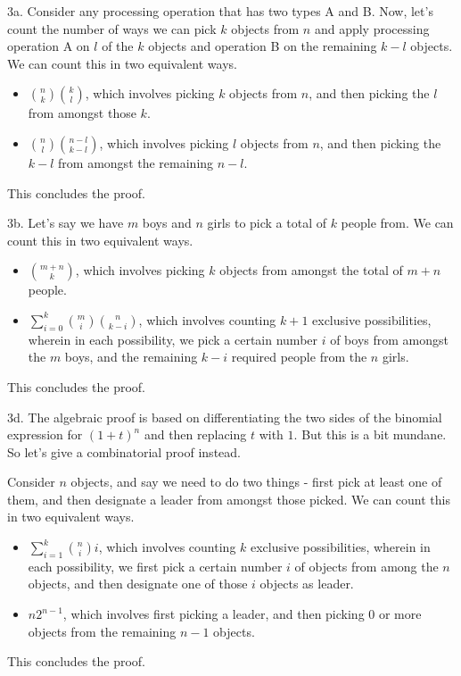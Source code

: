 \documentclass{article}
\begin{document}
3a. Consider any processing operation that has two types A and B. Now, let's count the number of ways we can pick $k$ objects from $n$ and apply processing operation A on $l$ of the $k$ objects and operation B on the remaining $k - l$ objects. We can count this in two equivalent ways.

\begin{itemize}
    \item ${n \choose k}{k \choose l}$, which involves picking $k$ objects from $n$, and then picking the $l$ from amongst those $k$.
    \item ${n \choose l}{n - l \choose k - l}$, which involves picking $l$ objects from $n$, and then picking the $k - l$ from amongst the remaining $n - l$.
\end{itemize}

This concludes the proof.

3b. Let's say we have $m$ boys and $n$ girls to pick a total of $k$ people from. We can count this in two equivalent ways.

\begin{itemize}
    \item ${m + n \choose k}$, which involves picking $k$ objects from amongst the total of $m + n$ people.
    \item $\sum_{i=0}^k {m \choose i}{n \choose k - i}$, which involves counting $k + 1$ exclusive possibilities, wherein in each possibility, we pick a certain number $i$ of boys from amongst the $m$ boys, and the remaining $k - i$ required people from the $n$ girls.
\end{itemize}

This concludes the proof.

3d. The algebraic proof is based on differentiating the two sides of the binomial expression for $(1 + t)^n$ and then replacing $t$ with $1$. But this is a bit mundane. So let's give a combinatorial proof instead.

Consider $n$ objects, and say we need to do two things - first pick at least one of them, and then designate a leader from amongst those picked. We can count this in two equivalent ways.

\begin{itemize}
    \item $\sum_{i=1}^k {n \choose i} i$, which involves counting $k$ exclusive possibilities, wherein in each possibility, we first pick a certain number $i$ of objects from among the $n$ objects, and then designate one of those $i$ objects as leader.
    \item $n2^{n - 1}$, which involves first picking a leader, and then picking $0$ or more objects from the remaining $n - 1$ objects. 
\end{itemize}

This concludes the proof.
\end{document}
